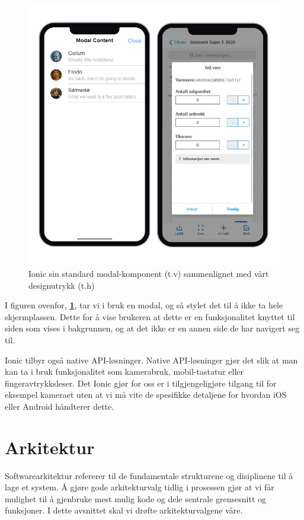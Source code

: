 \begin{figure}[H] 
    \centering
    \includegraphics[width=\textwidth]{figures/Tekniske-valg/Ionic/modal.jpg}
    \caption{Ionic sin standard modal-komponent (t.v) sammenlignet med vårt designutrykk (t.h)}
    \label{modalComparison}
\end{figure}

I figuren ovenfor, \textbf{\ref{modalComparison}}, tar vi i bruk en modal, og så stylet det til å ikke ta hele skjermplassen. Dette for å vise brukeren at dette er en funksjonalitet knyttet til siden som vises i bakgrunnen, og at det ikke er en annen side de har navigert seg til.

Ionic tilbyr også native API-løsninger. Native API-løsninger gjør det slik at man kan ta i bruk funksjonalitet som kamerabruk, mobil-tastatur eller fingeravtrykksleser. Det Ionic gjør for oss er i tilgjengeligjøre tilgang til for eksempel kameraet uten at vi må vite de spesifikke detaljene for hvordan iOS eller Android håndterer dette. 


\section{\textbf{Arkitektur}}
Softwarearkitektur refererer til de fundamentale strukturene og disiplinene til å lage et system. Å gjøre gode arkitekturvalg tidlig i prosessen gjør at vi får mulighet til å gjenbruke mest mulig kode og dele sentrale grensesnitt og funksjoner. I dette avsnittet skal vi drøfte arkitekturvalgene våre.


